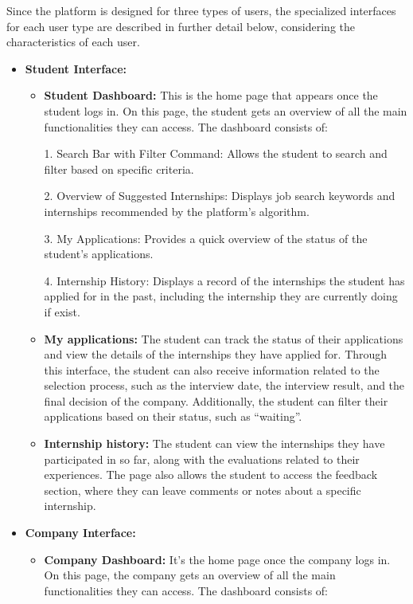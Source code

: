 Since the platform is designed for three types of users, the specialized interfaces for each user type are described in further detail
below, considering the characteristics of each user.
\begin{itemize}
    \item \textbf{Student Interface:}
    \begin{itemize}
        \item \textbf{Student Dashboard:} This is the home page that appears once the student logs in. On this page, the student gets an 
        overview of all the main functionalities they can access. The dashboard consists of:

        1. Search Bar with Filter Command: Allows the student to search and filter based on specific criteria.
        
        2. Overview of Suggested Internships: Displays job search keywords and internships recommended by the platform's algorithm.
        
        3. My Applications: Provides a quick overview of the status of the student's applications.
        
        4. Internship History: Displays a record of the internships the student has applied for in the past, including the internship they 
        are currently doing if exist.

        \item \textbf{My applications:} The student can track the status of their applications and view the details of the internships 
        they have applied for. Through this interface, the student can also receive information related to the selection process, such 
        as the interview date, the interview result, and the final decision of the company. Additionally, the student can filter their 
        applications based on their status, such as ``waiting''.

        \item \textbf{Internship history:} The student can view the internships they have participated in so far, along with the 
        evaluations related to their experiences. The page also allows the student to access the feedback section, where they can 
        leave comments or notes about a specific internship.

    \end{itemize}
    \item \textbf{Company Interface:} 
    \begin{itemize}
        \item \textbf{Company Dashboard:} It's the home page once the company logs in. On this page, the company gets an overview of 
        all the main functionalities they can access. The dashboard consists of:


\end{itemize}
\end{itemize}

